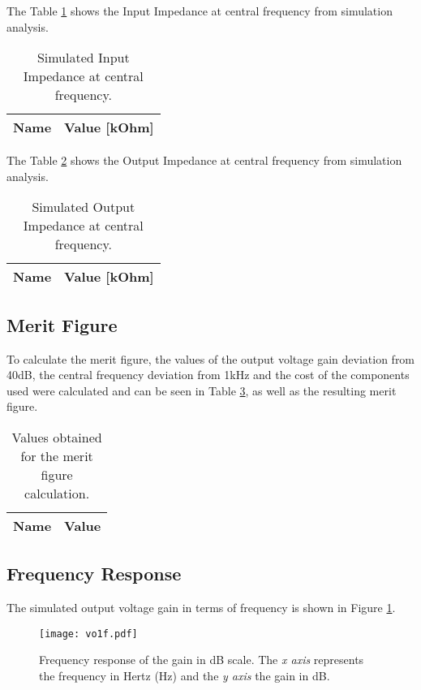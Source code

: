 The Table \ref{tab:sim_zin} shows the Input Impedance at central frequency from simulation analysis.

\begin{table}[H]
	\centering
	\begin{tabular}{|l|r|}
		\hline    
		{\bf Name} & {\bf Value [kOhm]} \\ \hline
		
	\end{tabular}
	\caption{Simulated Input Impedance at central frequency.}
	\label{tab:sim_zin}
\end{table}

The Table \ref{tab:sim_zout} shows the Output Impedance at central frequency from simulation analysis.

\begin{table}[H]
	\centering
	\begin{tabular}{|l|r|}
		\hline    
		{\bf Name} & {\bf Value [kOhm]} \\ \hline
		
	\end{tabular}
	\caption{Simulated Output Impedance at central frequency.}
	\label{tab:sim_zout}
\end{table}


\subsection{Merit Figure}

To calculate the merit figure, the values of the output voltage gain deviation from 40dB, the central frequency deviation from 1kHz and the cost of the components used were calculated and can be seen in Table \ref{tab:sim_merit}, as well as the resulting merit figure.

\begin{table}[H]
	\centering
	\begin{tabular}{|l|r|}
		\hline    
		{\bf Name} & {\bf Value} \\ \hline
		
	\end{tabular}
	\caption{Values obtained for the merit figure calculation.}
	\label{tab:sim_merit}
\end{table}

\vspace{-2.5cm}
\subsection{Frequency Response}

The simulated output voltage gain in terms of frequency is shown in Figure \ref{fig:sim_gaindB}.
\vspace{-2cm}
\begin{figure}[H] \centering
	\texttt{[image: vo1f.pdf]}
	\caption {Frequency response of the gain in dB scale. The \textit{x axis} represents the frequency in Hertz (Hz) and the \textit{y axis} the gain in dB.}
	\label{fig:sim_gaindB}
\end{figure}

